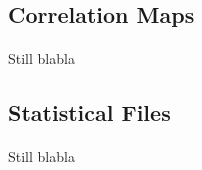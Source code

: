 \documentclass[a4paper]{article}
\begin{document}
\subsection{Correlation Maps}
\paragraph{} Still blabla
\subsection{Statistical Files}
\paragraph{} Still blabla
\end{document}
